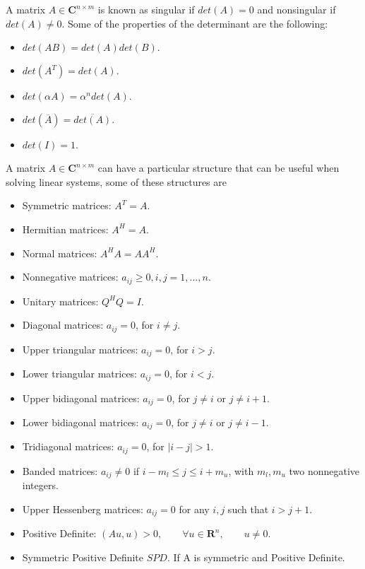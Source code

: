 \documentclass[a4paper,10pt]{report}
\begin{document}
A matrix $A\in \mathbf{C}^{n\times m}$ is known as singular if $det(A)=0$ and nonsingular if $det(A)\neq 0$.
Some of the properties of the determinant are the following:
\begin{itemize}
\item $det(AB)=det(A)det(B).$
\item $det(A^T)=det(A).$
\item $det(\alpha A)=\alpha^ndet(A).$
\item $det(\overline A)=\overline{det(A)}.$
\item $det(I)=1.$
\end{itemize}
A matrix $A\in \mathbf{C}^{n\times m}$ can have a particular structure that can be useful when solving linear systems, some of these structures are
\begin{itemize}
\item Symmetric matrices: $A^T=A.$
\item Hermitian matrices: $A^H=A.$
\item Normal matrices: $A^HA=AA^H.$
\item Nonnegative matrices: $a_{ij}\geq0, i,j=1,\dots,n.$
\item Unitary matrices: $Q^HQ=I.$
\item Diagonal matrices: $a_{ij}=0$, for $i\neq j.$
\item Upper triangular matrices: $a_{ij}=0$, for $i>j.$
\item Lower triangular matrices: $a_{ij}=0$, for $i<j.$
\item Upper bidiagonal matrices: $a_{ij}=0$, for $j\neq i$ or $j\neq i+1.$
\item Lower bidiagonal matrices: $a_{ij}=0$, for $j\neq i$ or $j \neq i-1.$
\item Tridiagonal matrices: $a_{ij}=0$, for $|i-j|>1.$
\item Banded matrices: $a_{ij}\neq 0$ if $i-m_l\leq j \leq i+m_u$, with $m_l,m_u$ two nonnegative integers.
\item Upper Hessenberg matrices: $a_{ij}=0$ for any $i,j$ such that $i>j+1$.
\item Positive Definite: $(Au,u)>0, \qquad \forall u \in \mathbf{R}^n, \qquad u\neq0.$
\item Symmetric Positive Definite $SPD$. If A is symmetric and Positive Definite.
\end{itemize}
\end{document}

